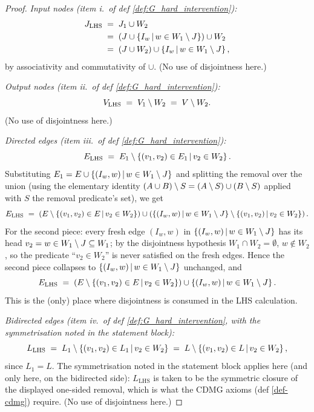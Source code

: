 \documentclass[main]{subfiles}
\begin{document}
\begin{proof}
\medskip\noindent\emph{Input nodes (item i.\ of def \ref{def:G_hard_intervention}):}
\begin{align*}
    J_{\mathrm{LHS}}
        &\;=\; J_1 \cup W_2 \\
        &\;=\; \left ( J \cup \left \{ I_w \,\middle|\, w \in W_1 \setminus J \right \} \right ) \cup W_2 \\
        &\;=\; (J \cup W_2) \cup \left \{ I_w \,\middle|\, w \in W_1 \setminus J \right \},
\end{align*}
by associativity and commutativity of $\cup$. (No use of disjointness here.)

\medskip\noindent\emph{Output nodes (item ii.\ of def \ref{def:G_hard_intervention}):}
\[
    V_{\mathrm{LHS}} \;=\; V_1 \setminus W_2 \;=\; V \setminus W_2.
\]
(No use of disjointness here.)

\medskip\noindent\emph{Directed edges (item iii.\ of def \ref{def:G_hard_intervention}):}
\[
    E_{\mathrm{LHS}} \;=\; E_1 \setminus \left \{ (v_1, v_2) \in E_1 \,\middle|\, v_2 \in W_2 \right \}.
\]
Substituting $E_1 = E \cup \left \{ (I_w, w) \,\middle|\, w \in W_1 \setminus J \right \}$ and splitting the removal over the union (using the elementary identity $(A \cup B) \setminus S = (A \setminus S) \cup (B \setminus S)$ applied with $S$ the removal predicate's set), we get
\[
    E_{\mathrm{LHS}} \;=\; \left ( E \setminus \left \{ (v_1, v_2) \in E \,\middle|\, v_2 \in W_2 \right \} \right ) \cup \left ( \left \{ (I_w, w) \,\middle|\, w \in W_1 \setminus J \right \} \setminus \left \{ (v_1, v_2) \,\middle|\, v_2 \in W_2 \right \} \right ).
\]
For the second piece: every fresh edge $(I_w, w)$ in $\left \{ (I_w, w) \,\middle|\, w \in W_1 \setminus J \right \}$ has its head $v_2 = w \in W_1 \setminus J \subseteq W_1$; by the disjointness hypothesis $W_1 \cap W_2 = \emptyset$, $w \notin W_2$, so the predicate ``$v_2 \in W_2$'' is never satisfied on the fresh edges. Hence the second piece collapses to $\left \{ (I_w, w) \,\middle|\, w \in W_1 \setminus J \right \}$ unchanged, and
\[
    E_{\mathrm{LHS}} \;=\; \left ( E \setminus \left \{ (v_1, v_2) \in E \,\middle|\, v_2 \in W_2 \right \} \right ) \cup \left \{ (I_w, w) \,\middle|\, w \in W_1 \setminus J \right \}.
\]
This is the (only) place where disjointness is consumed in the LHS calculation.

\medskip\noindent\emph{Bidirected edges (item iv.\ of def \ref{def:G_hard_intervention}, with the symmetrisation noted in the statement block):}
\[
    L_{\mathrm{LHS}} \;=\; L_1 \setminus \left \{ (v_1, v_2) \in L_1 \,\middle|\, v_2 \in W_2 \right \} \;=\; L \setminus \left \{ (v_1, v_2) \in L \,\middle|\, v_2 \in W_2 \right \},
\]
since $L_1 = L$. The symmetrisation noted in the statement block applies here (and only here, on the bidirected side): $L_{\mathrm{LHS}}$ is taken to be the symmetric closure of the displayed one-sided removal, which is what the CDMG axioms (def \ref{def-cdmg}) require. (No use of disjointness here.)


\end{proof}
\end{document}

